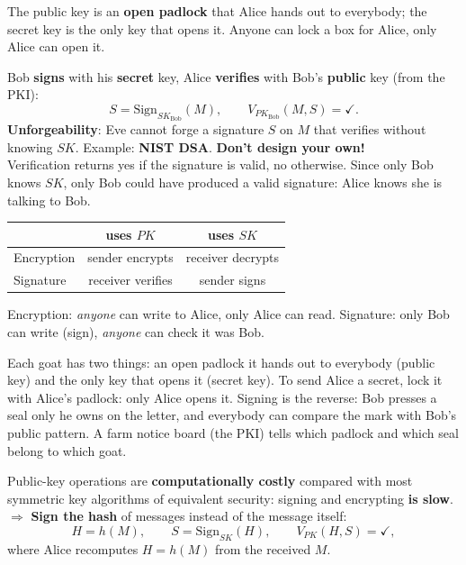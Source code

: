 \begin{rembox}[title=Intuition: the padlock]
The public key is an \textbf{open padlock} that Alice hands out to everybody; the secret
key is the only key that opens it. Anyone can lock a box for Alice, only Alice can open
it.
\end{rembox}

\begin{defnbox}[title=Digital signatures (signing and verification)]
Bob \textbf{signs} with his \textbf{secret} key, Alice \textbf{verifies} with Bob's
\textbf{public} key (from the PKI):
\[
  S = \mathrm{Sign}_{SK_{\text{Bob}}}(M), \qquad
  V_{PK_{\text{Bob}}}(M, S) = \checkmark .
\]
\textbf{Unforgeability}: Eve cannot forge a signature $S$ on $M$ that verifies without
knowing $SK$. Example: \textbf{NIST DSA}. \textbf{Don't design your own!} \\
Verification returns yes if the signature is valid, no otherwise. Since only Bob knows $SK$, only
Bob could have produced a valid signature: Alice knows she is talking to Bob.
\end{defnbox}

\begin{rembox}[title=Encryption vs.\ signature: who uses which key?]
\begin{center}
\begin{tabular}{l|c|c}
                   & \textbf{uses $PK$} & \textbf{uses $SK$} \\ \hline
Encryption         & sender encrypts    & receiver decrypts  \\
Signature          & receiver verifies  & sender signs
\end{tabular}
\end{center}
Encryption: \emph{anyone} can write to Alice, only Alice can read. Signature: only Bob can
write (sign), \emph{anyone} can check it was Bob.
\end{rembox}

\begin{goatbox}
Each goat has two things: an open padlock it hands out to everybody (public key) and the only key
that opens it (secret key). To send Alice a secret, lock it with Alice's padlock: only Alice opens
it. Signing is the reverse: Bob presses a seal only he owns on the letter, and everybody can
compare the mark with Bob's public pattern. A farm notice board (the PKI) tells which padlock and
which seal belong to which goat.
\end{goatbox}

\begin{propbox}[title=Sign the hash of messages]
Public-key operations are \textbf{computationally costly} compared with most symmetric
key algorithms of equivalent security: signing and encrypting \textbf{is slow}. \\
$\Rightarrow$ \textbf{Sign the hash} of messages instead of the message itself:
\[
  H = h(M), \qquad S = \mathrm{Sign}_{SK}(H), \qquad V_{PK}(H, S) = \checkmark ,
\]
where Alice recomputes $H = h(M)$ from the received $M$.
\end{propbox}

